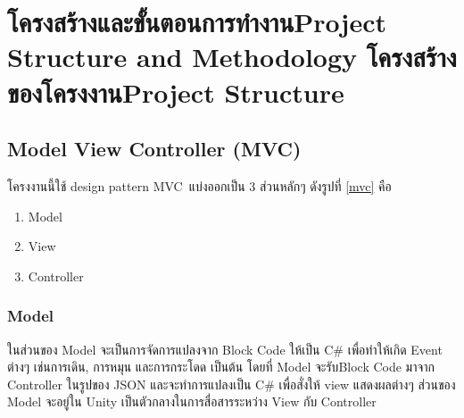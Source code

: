 \chapter{\ifproject%
\ifcpe โครงสร้างและขั้นตอนการทำงาน\else Project Structure and Methodology\fi
\else%
\ifcpe โครงสร้างของโครงงาน\else Project Structure\fi
\fi
}


\makeatletter


\makeatother

\section{Model View Controller (MVC)}
โครงงานนี้ใช้ design pattern MVC~\cite{mvc}แบ่งออกเป็น 3 ส่วนหลักๆ ดังรูปที่ \ref{mvc} คือ 
\begin{enumerate}
    \item Model
    \item View
    \item Controller
\end{enumerate}


\subsection{Model}
 ในส่วนของ Model จะเป็นการจัดการแปลงจาก Block Code ให้เป็น C\# เพื่อทำให้เกิด Event ต่างๆ เช่นการเดิน, การหมุน
 และการกระโดด เป็นต้น โดยที่ Model จะรับBlock Code มาจาก Controller ในรูปของ JSON
 และจะทำการแปลงเป็น C\# เพื่อสั่งให้ view แสดงผลต่างๆ ส่วนของ Model จะอยู่ใน Unity
 เป็นตัวกลางในการสื่อสารระหว่าง View กับ Controller

